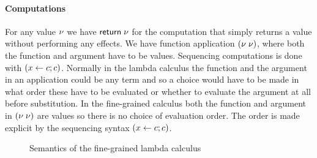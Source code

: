 {\paragraph{Computations} For any value $\nu$ we have $\mathsf{return} \; \nu$ for the computation that simply returns a value without performing any effects. We have function application $(\nu \; \nu)$, where both the function and argument have to be values. Sequencing computations is done with $(x \leftarrow c ; c)$. Normally in the lambda calculus the function and the argument in an application could be any term and so a choice would have to be made in what order these have to be evaluated or whether to evaluate the argument at all before substitution. In the fine-grained calculus both the function and argument in $(\nu \; \nu)$ are values so there is no choice of evaluation order. The order is made explicit by the sequencing syntax $(x \leftarrow c ; c)$.


\begin{figure}
\caption{Semantics of the fine-grained lambda calculus}
\centering
{}
\end{figure}

}
